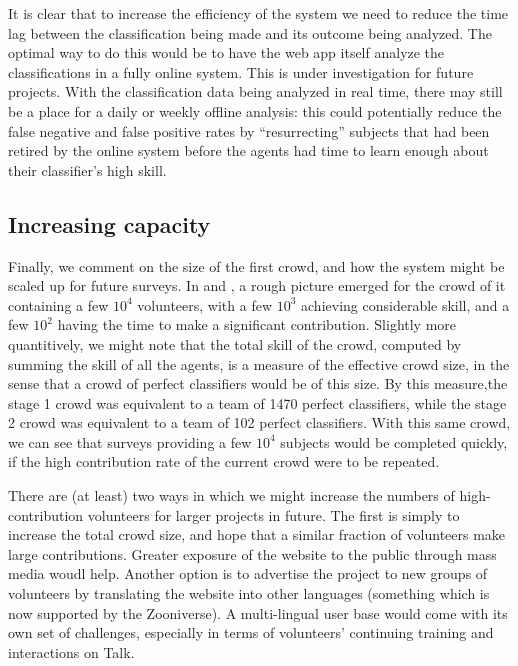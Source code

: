 \documentclass[useAMS,usenatbib,a4paper]{mn2e}
\begin{document}
It is clear that to increase the efficiency of the system we need to reduce
the time lag between the classification being made and its outcome being
analyzed. The optimal way to do this would be to have the web app itself
analyze the classifications in a fully online system. This is under
investigation for future projects. With the classification data being analyzed
in real time, there may still be a place for a daily or weekly offline
analysis: this could potentially reduce the false negative and false positive
rates by ``resurrecting'' subjects that had been retired by the online system
before the agents had time to learn enough about their classifier's high
skill.



\subsection{Increasing capacity}
\label{sec:discuss:capacity}

Finally, we comment on the size of the first \sw crowd, and how the system
might be scaled up for future surveys. In  and 
, a rough picture emerged for the \sw crowd of
it containing a few $10^4$ volunteers, with a few $10^3$ achieving
considerable skill, and a few $10^2$ having the time to make a significant
contribution. Slightly more quantitively, we might note that  the total skill
of the crowd, computed by summing the skill of all the agents, is a measure of
the effective crowd size, in the sense that a crowd of perfect classifiers
would be of this size. By this measure,the stage 1 crowd was equivalent to a
team of 1470 perfect classifiers, while the stage 2 crowd was equivalent to a
team of 102 perfect classifiers. With this same crowd, we can see that surveys
providing a few $10^4$ subjects would be completed quickly, if the high
contribution rate of the current crowd were to be repeated. 

There are (at least) two ways in which we might increase the numbers of
high-contribution volunteers for larger projects in future. The first is
simply to increase the total crowd size, and hope that a similar fraction of
volunteers make large contributions. Greater exposure of the website to the
public through mass media woudl help. Another option is to advertise the
project to new groups of volunteers by translating the website into other
languages (something which is now supported by the Zooniverse). A
multi-lingual user base would come with its own set of challenges, especially
in terms of volunteers' continuing training and interactions on Talk. 
\end{document}
